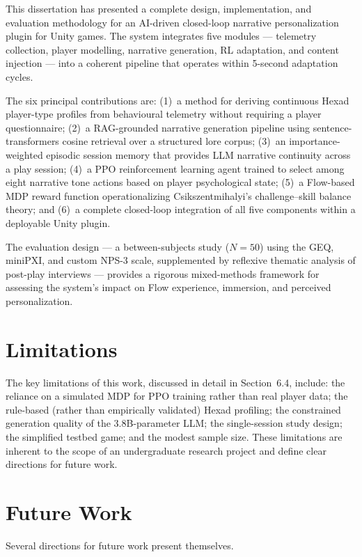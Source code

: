 \documentclass[12pt,a4paper]{report}
\begin{document}
This dissertation has presented a complete design, implementation, and evaluation methodology for an AI-driven closed-loop narrative personalization plugin for Unity games. The system integrates five modules --- telemetry collection, player modelling, narrative generation, RL adaptation, and content injection --- into a coherent pipeline that operates within 5-second adaptation cycles.

The six principal contributions are: (1)~a method for deriving continuous Hexad player-type profiles from behavioural telemetry without requiring a player questionnaire; (2)~a RAG-grounded narrative generation pipeline using sentence-transformers cosine retrieval over a structured lore corpus; (3)~an importance-weighted episodic session memory that provides LLM narrative continuity across a play session; (4)~a PPO reinforcement learning agent trained to select among eight narrative tone actions based on player psychological state; (5)~a Flow-based MDP reward function operationalizing Csikszentmihalyi's challenge--skill balance theory; and (6)~a complete closed-loop integration of all five components within a deployable Unity plugin.

The evaluation design --- a between-subjects study ($N = 50$) using the GEQ, miniPXI, and custom NPS-3 scale, supplemented by reflexive thematic analysis of post-play interviews --- provides a rigorous mixed-methods framework for assessing the system's impact on Flow experience, immersion, and perceived personalization.

\section{Limitations}

The key limitations of this work, discussed in detail in Section~6.4, include: the reliance on a simulated MDP for PPO training rather than real player data; the rule-based (rather than empirically validated) Hexad profiling; the constrained generation quality of the 3.8B-parameter LLM; the single-session study design; the simplified testbed game; and the modest sample size. These limitations are inherent to the scope of an undergraduate research project and define clear directions for future work.

\section{Future Work}

Several directions for future work present themselves.
\end{document}
